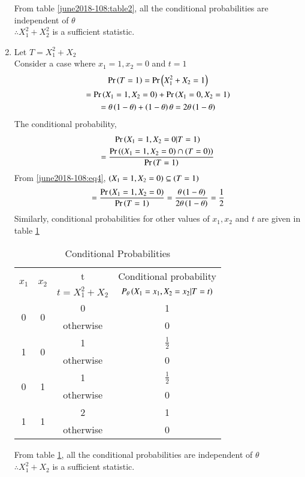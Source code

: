 \begin{enumerate}
    From table \ref{june2018-108:table2}, all the conditional probabilities are independent of $\theta$\\ $\therefore X_1^2+X_2^2$ is a sufficient statistic.
    
    \item Let $T=X_1^2+X_2$\\
    Consider a case where $x_1=1, x_2=0$ and $t=1$
    \begin{multline}
        \label{june2018-108:eq4}\Pr\left(T=1\right)=\Pr\left(X_1^2+X_2=1\right)\\=\Pr\left(X_1=1,X_2=0\right)+\Pr\left(X_1=0,X_2=1\right)\\=\theta \left(1-\theta\right) + \left(1-\theta\right)\theta  = 2\theta \left(1-\theta\right)
    \end{multline}
    The conditional probability,
    \begin{multline}
        \Pr\left(X_1=1,X_2=0 | T=1\right)\\
        =\frac{\Pr\left(\left(X_1=1,X_2=0\right)\cap\left(T=0\right)\right)}{\Pr\left(T=1\right)}
    \end{multline}
    From \eqref{june2018-108:eq4}, $\left(X_1=1,X_2=0\right) \subseteq \left(T=1\right)$
    \begin{multline}
       =\frac{\Pr\left(X_1=1,X_2=0\right)}{\Pr\left(T=1\right)}=\frac{\theta\left(1-\theta\right)}{2\theta\left(1-\theta\right)}=\frac{1}{2}
    \end{multline}
    Similarly, conditional probabilities for other values of $x_1,x_2$ and $t$ are given in table \ref{june2018-108:table3}
    
    \begin{center}
    \begin{table}[h!]
    \begin{tabular}[width=\columnwidth]{|c|c|c|c|}
         \hline
        \multirow{2}{*}{$x_1$} & \multirow{2}{*}{$x_2$} & t & Conditional probability\\
        & & $t=X_1^2+X_2$ & $P_\theta\left(X_1=x_1,X_2=x_2|T=t\right)$\\
        \hline
        \multirow{2}{*}{0} & \multirow{2}{*}{0} & 0 & 1\\ 
        & & otherwise & 0 \\ 
        \hline
        \multirow{2}{*}{1} & \multirow{2}{*}{0} & 1 & $\frac{1}{2}$\\ 
        & & otherwise & 0 \\ 
        \hline
        \multirow{2}{*}{0} & \multirow{2}{*}{1} & 1 & $\frac{1}{2}$\\ 
        & & otherwise & 0 \\ 
        \hline
        \multirow{2}{*}{1} & \multirow{2}{*}{1} & 2 & 1\\ 
        & & otherwise & 0 \\        
        \hline
    \end{tabular}
    \caption{Conditional Probabilities}
    \label{june2018-108:table3}
    \end{table}  
    \end{center}
    From table \ref{june2018-108:table3}, all the conditional probabilities are independent of $\theta$\\
    $\therefore X_1^2+X_2$ is a sufficient statistic.
    
\end{enumerate}

